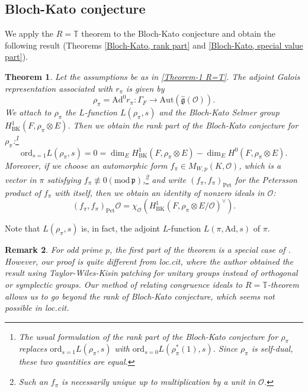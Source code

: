 \documentclass[12pt,oneside,reqno]{amsart}
\newcommand{\Ocal}{\mathcal{O}}
\theoremstyle{plain}
\newtheorem{theorem}{Theorem}[section]
\newtheorem{remark}[theorem]{Remark}
\begin{document}
	
	
	
	
	\subsection*{Bloch-Kato conjecture}
	We apply the $R=\mathbb{T}$ theorem to the Bloch-Kato conjecture and obtain the following result (Theorems \ref{Bloch-Kato, rank part} and \ref{Bloch-Kato, special value part}).
	
	\begin{theorem}\label{Theorem 3 Bloch-Kato}
		Let the assumptions be as in \ref{Theorem-1 R=T}.
		The adjoint Galois representation associated with $r_\pi$ is given by
		\[
		\rho_\pi=\mathrm{Ad}^0r_\pi\colon\Gamma_{F}\to\mathrm{Aut}(\widehat{\mathfrak{g}}(\Ocal)).
		\]
		We attach to $\rho_\pi$ the $L$-function $L(\rho_\pi,s)$ and the Bloch-Kato Selmer group $H^1_\mathrm{BK}(F,\rho_\pi\otimes E)$. Then we obtain the rank part of the Bloch-Kato conjecture for $\rho_\pi$:\footnote{The usual formulation of the rank part of the Bloch-Kato conjecture for $\rho_\pi$ replaces $\mathrm{ord}_{s=1}L(\rho_\pi,s)$ with $\mathrm{ord}_{s=0}L(\rho_\pi^\ast(1),s)$. Since $\rho_\pi$ is self-dual, these two quantities are equal.}
		\[
		\mathrm{ord}_{s=1}L(\rho_\pi,s)
		=0
		=
		\dim_E H^1_\mathrm{BK}(F,\rho_\pi\otimes E)
		-
		\dim_E H^0(F,\rho_\pi\otimes E).		
		\]
		Moreover, if we choose an automorphic form $f_\pi\in M_{W,p}(K,\mathcal{O})$, which is a vector in $\pi$ satisfying $f_\pi\not\equiv0(\mathrm{mod}\,\mathfrak{p})$,\footnote{Such an $f_\pi$ is necessarily unique up to multiplication by a unit in $\mathcal{O}$.} and write $(f_\pi,f_\pi)_\mathrm{Pet}$ for the Petersson product of $f_\pi$ with itself, then we obtain an identity of nonzero ideals in $\mathcal{O}$:
		\[
		(f_\pi,f_\pi)_\mathrm{Pet}\mathcal{O}
		=
		\chi_\mathcal{O}(H^1_\mathrm{BK}(F,\rho_\pi\otimes E/\mathcal{O})^\vee).
		\]
	\end{theorem}
	
	Note that $L(\rho_\pi,s)$ is, in fact, the adjoint $L$-function $L(\pi,\mathrm{Ad},s)$ of $\pi$.
	
	
	\begin{remark}\rm
		For odd prime $p$, the first part of the theorem is a special case of \cite[Theorem B]{Allen2016}. However, our proof is quite different from \emph{loc.cit}, where the author obtained the result using Taylor-Wiles-Kisin patching for unitary groups instead of orthogonal or symplectic groups. Our method of relating congruence ideals to $R=\mathbb{T}$-theorem allows us to go beyond the rank of Bloch-Kato conjecture, which seems not possible in \emph{loc.cit}.
	\end{remark}
	
\end{document}
